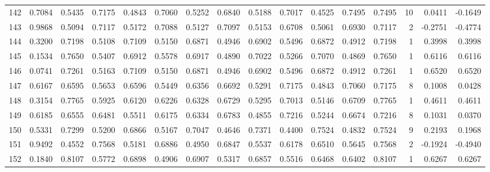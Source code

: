 \begin{tabular}{lrrrrrrrrrrrrrrr}
142 &      0.7084 &  0.5435 &  0.7175 &  0.4843 &  0.7060 &  0.5252 &  0.6840 &  0.5188 &  0.7017 &  0.4525 &   0.7495 &     0.7495 &     10 &                    0.0411 &                    -0.1649 \\
143 &      0.9868 &  0.5094 &  0.7117 &  0.5172 &  0.7088 &  0.5127 &  0.7097 &  0.5153 &  0.6708 &  0.5061 &   0.6930 &     0.7117 &      2 &                   -0.2751 &                    -0.4774 \\
144 &      0.3200 &  0.7198 &  0.5108 &  0.7109 &  0.5150 &  0.6871 &  0.4946 &  0.6902 &  0.5496 &  0.6872 &   0.4912 &     0.7198 &      1 &                    0.3998 &                     0.3998 \\
145 &      0.1534 &  0.7650 &  0.5407 &  0.6912 &  0.5578 &  0.6917 &  0.4890 &  0.7022 &  0.5266 &  0.7070 &   0.4869 &     0.7650 &      1 &                    0.6116 &                     0.6116 \\
146 &      0.0741 &  0.7261 &  0.5163 &  0.7109 &  0.5150 &  0.6871 &  0.4946 &  0.6902 &  0.5496 &  0.6872 &   0.4912 &     0.7261 &      1 &                    0.6520 &                     0.6520 \\
147 &      0.6167 &  0.6595 &  0.5653 &  0.6596 &  0.5449 &  0.6356 &  0.6692 &  0.5291 &  0.7175 &  0.4843 &   0.7060 &     0.7175 &      8 &                    0.1008 &                     0.0428 \\
148 &      0.3154 &  0.7765 &  0.5925 &  0.6120 &  0.6226 &  0.6328 &  0.6729 &  0.5295 &  0.7013 &  0.5146 &   0.6709 &     0.7765 &      1 &                    0.4611 &                     0.4611 \\
149 &      0.6185 &  0.6555 &  0.6481 &  0.5511 &  0.6175 &  0.6334 &  0.6783 &  0.4855 &  0.7216 &  0.5244 &   0.6674 &     0.7216 &      8 &                    0.1031 &                     0.0370 \\
150 &      0.5331 &  0.7299 &  0.5200 &  0.6866 &  0.5167 &  0.7047 &  0.4646 &  0.7371 &  0.4400 &  0.7524 &   0.4832 &     0.7524 &      9 &                    0.2193 &                     0.1968 \\
151 &      0.9492 &  0.4552 &  0.7568 &  0.5181 &  0.6886 &  0.4950 &  0.6847 &  0.5537 &  0.6178 &  0.6510 &   0.5645 &     0.7568 &      2 &                   -0.1924 &                    -0.4940 \\
152 &      0.1840 &  0.8107 &  0.5772 &  0.6898 &  0.4906 &  0.6907 &  0.5317 &  0.6857 &  0.5516 &  0.6468 &   0.6402 &     0.8107 &      1 &                    0.6267 &                     0.6267 \\

\end{tabular}
